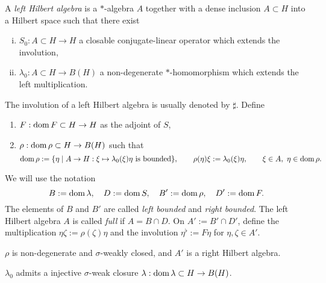 \documentclass{../../large}
\begin{document}
\begin{prb}
A \emph{left Hilbert algebra} is a $*$-algebra $A$ together with a dense inclusion $A\subset H$ into a Hilbert space such that there exist
\begin{enumerate}[(i)]
\item $S_0:A\subset H\to H$ a closable conjugate-linear operator which extends the involution,
\item $\lambda_0:A\subset H\to B(H)$ a non-degenerate $*$-homomorphism which extends the left multiplication.
\end{enumerate}
The involution of a left Hilbert algebra is usually denoted by $\sharp$.
Define
\begin{enumerate}[(i')]
\item $F:\operatorname{dom} F\subset H\to H$ as the adjoint of $S$,
\item $\rho:\operatorname{dom}\rho\subset H\to B(H)$ such that
\[\dom\rho:=\{\eta\mid A\to H:\xi\mapsto\lambda_0(\xi)\eta\text{ is bounded}\},\qquad\rho(\eta)\xi:=\lambda_0(\xi)\eta,\qquad\xi\in A,\ \eta\in\dom\rho.\]
\end{enumerate}
We will use the notation
\[B:=\operatorname{dom}\lambda,\quad D:=\operatorname{dom} S,\quad B':=\operatorname{dom}\rho,\quad D':=\operatorname{dom} F.\]
The elements of $B$ and $B'$ are called \emph{left bounded} and \emph{right bounded}.
The left Hilbert algebra $A$ is called \emph{full} if $A=B\cap D$.
On $A':=B'\cap D'$, define the multiplication $\eta\zeta:=\rho(\zeta)\eta$ and the involution $\eta^\flat:=F\eta$ for $\eta,\zeta\in A'$.
\begin{parts}
\item $\rho$ is non-degenerate and $\sigma$-weakly closed, and $A'$ is a right Hilbert algebra.
\item $\lambda_0$ admits a injective $\sigma$-weak closure $\lambda:\operatorname{dom}\lambda\subset H\to B(H)$.
\end{parts}
\end{prb}
\end{document}
